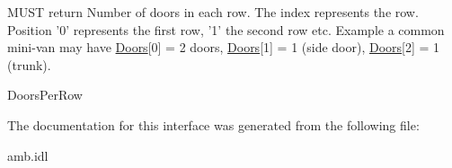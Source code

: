 M\-U\-S\-T return Number of doors in each row. The index represents the row. Position '0' represents the first row, '1' the second row etc. Example a common mini-\/van may have \hyperlink{interfaceVehicle_1_1org_1_1automotive_1_1Doors}{Doors}\mbox{[}0\mbox{]} = 2 doors, \hyperlink{interfaceVehicle_1_1org_1_1automotive_1_1Doors}{Doors}\mbox{[}1\mbox{]} = 1 (side door), \hyperlink{interfaceVehicle_1_1org_1_1automotive_1_1Doors}{Doors}\mbox{[}2\mbox{]} = 1 (trunk). 

Doors\-Per\-Row 

The documentation for this interface was generated from the following file\-:\begin{DoxyCompactItemize}
\item 
amb.\-idl\end{DoxyCompactItemize}
